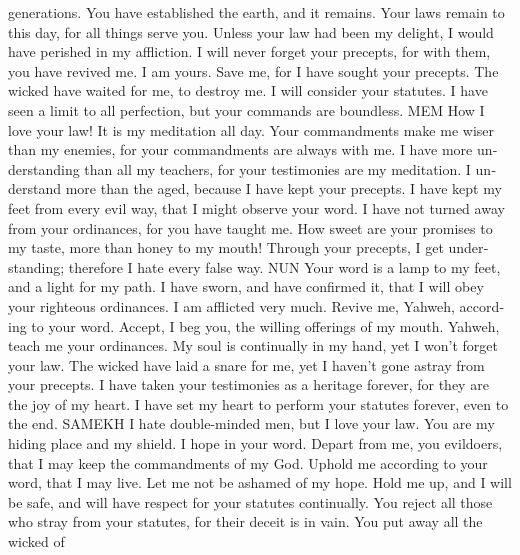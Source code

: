 \begin{paracol}{2}
\begin{otherlanguage}{english}
generations. You have established the earth, and it remains.
 Your laws remain to this day, for all things serve you.
 Unless your law had been my delight, I would have
perished in my affliction.  I will never forget your
precepts, for with them, you have revived me.  I am
yours. Save me, for I have sought your precepts.  The
wicked have waited for me, to destroy me. I will consider your statutes.
 I have seen a limit to all perfection, but your commands
are boundless. MEM  How I love your law! It is my
meditation all day.  Your commandments make me wiser than
my enemies, for your commandments are always with me.  I
have more understanding than all my teachers, for your testimonies are
my meditation.  I understand more than the aged, because
I have kept your precepts.  I have kept my feet from
every evil way, that I might observe your word.  I have
not turned away from your ordinances, for you have taught me.
 How sweet are your promises to my taste, more than
honey to my mouth!  Through your precepts, I get
understanding; therefore I hate every false way. NUN 
Your word is a lamp to my feet, and a light for my path.
 I have sworn, and have confirmed it, that I will obey
your righteous ordinances.  I am afflicted very much.
Revive me, Yahweh, according to your word.  Accept, I
beg you, the willing offerings of my mouth. Yahweh, teach me your
ordinances.  My soul is continually in my hand, yet I
won't forget your law.  The wicked have laid a snare for
me, yet I haven't gone astray from your precepts.  I
have taken your testimonies as a heritage forever, for they are the joy
of my heart.  I have set my heart to perform your
statutes forever, even to the end. SAMEKH  I hate
double-minded men, but I love your law.  You are my
hiding place and my shield. I hope in your word.  Depart
from me, you evildoers, that I may keep the commandments of my God.
 Uphold me according to your word, that I may live. Let
me not be ashamed of my hope.  Hold me up, and I will be
safe, and will have respect for your statutes continually.
 You reject all those who stray from your statutes, for
their deceit is in vain.  You put away all the wicked of

\end{otherlanguage}
\end{paracol}

